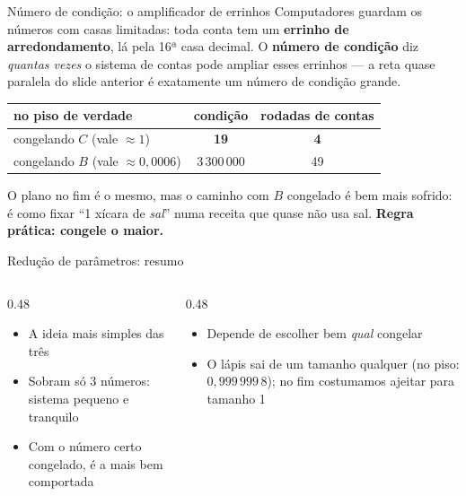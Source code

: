 \documentclass[aspectratio=169,11pt]{beamer}
\newcommand{\bnum}[1]{\textbf{\textcolor{mTeal}{#1}}}
\begin{document}
\begin{frame}{Número de condição: o amplificador de errinhos}
  Computadores guardam os números com casas limitadas: toda conta tem um
  \bnum{errinho de arredondamento}, lá pela 16ª casa decimal. O \bnum{número de condição}
  diz \emph{quantas vezes} o sistema de contas pode ampliar esses errinhos --- a reta quase
  paralela do slide anterior é exatamente um número de condição grande.
  \begin{center}
  \renewcommand{\arraystretch}{1.25}
  \begin{tabular}{lcc}
    \toprule
    no piso de verdade & condição & rodadas de contas \\
    \midrule
    congelando $C$ (vale $\approx 1$) & \bnum{19} & \bnum{4} \\
    congelando $B$ (vale $\approx 0{,}0006$) & \alert{3\,300\,000} & \alert{49} \\
    \bottomrule
  \end{tabular}
  \end{center}
  O plano no fim é o mesmo, mas o caminho com $B$ congelado é bem mais sofrido: é como
  fixar ``1 xícara de \emph{sal}'' numa receita que quase não usa sal.
  \textbf{Regra prática: congele o maior.}
\end{frame}

\begin{frame}{Redução de parâmetros: resumo}
  \begin{columns}[T]
    \begin{column}{0.48\textwidth}
      \begin{ideia}[title={Vantagens}]
        \begin{itemize}
          \item A ideia mais simples das três
          \item Sobram só 3 números: sistema pequeno e tranquilo
          \item Com o número certo congelado, é a mais bem comportada
        \end{itemize}
      \end{ideia}
    \end{column}
    \begin{column}{0.48\textwidth}
      \begin{cuidado}[title={Cuidados}]
        \begin{itemize}
          \item Depende de escolher bem \emph{qual} congelar
          \item O lápis sai de um tamanho qualquer (no piso: $0{,}999\,999\,8$); no fim
                costumamos ajeitar para tamanho 1
        \end{itemize}
      \end{cuidado}
    \end{column}
  \end{columns}
\end{frame}
\end{document}
